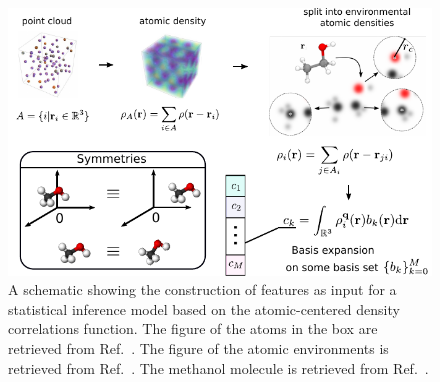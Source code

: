 \begin{figure}
    \includegraphics[width=\textwidth]{fig/atomistic_repr_schematic.pdf}
    \caption{A schematic showing the construction of features as input for a statistical inference model based on the atomic-centered density correlations function. The figure of the atoms in the box are retrieved from Ref.~\cite{noh2019inverse}. The figure of the atomic environments is retrieved from Ref.~\cite{willatt2019atom}. The methanol molecule is retrieved from Ref.~\cite{wiki:Alcohol_(chemistry)}.}
    \label{fig:acdc-scheme}
\end{figure}



